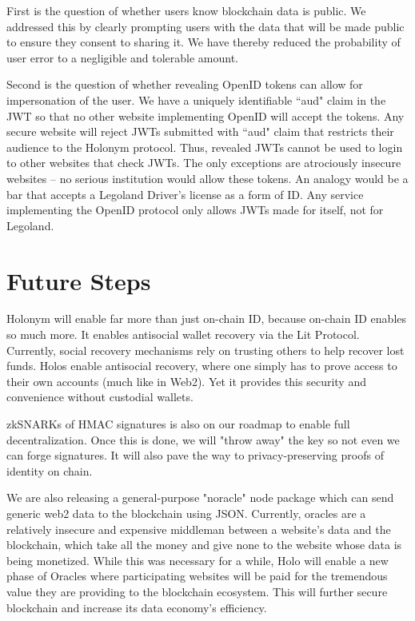 \documentclass[11pt,oneside,a4paper]{article}
\begin{document}
		First is the question of whether users know blockchain data is public. We addressed this by clearly prompting users with the data that will be made public to ensure they consent to sharing it. We have thereby reduced the probability of user error to a negligible and tolerable amount.
		
		Second is the question of whether revealing OpenID tokens can allow for impersonation of the user. We have a uniquely identifiable ``aud" claim in the JWT so that no other website implementing OpenID will accept the tokens. Any secure website will reject JWTs submitted with ``aud" claim that restricts their audience to the Holonym protocol. Thus, revealed JWTs cannot be used to login to other websites that check JWTs. The only exceptions are atrociously insecure websites -- no serious institution would allow these tokens. An analogy would be a bar that accepts a Legoland Driver's license as a form of ID. Any service implementing the OpenID protocol only allows JWTs made for itself, not for Legoland. 		
	\section*{Future Steps}
	
	Holonym will enable far more than just on-chain ID, because on-chain ID enables so much more. It enables antisocial wallet recovery via the Lit Protocol. Currently, social recovery mechanisms rely on trusting others to help recover lost funds. Holos enable antisocial recovery, where one simply has to prove access to their own accounts (much like in Web2). Yet it provides this security and convenience without custodial wallets. 
	

    zkSNARKs of HMAC signatures is also on our roadmap to enable full decentralization. Once this is done, we will "throw away" the key so not even we can forge signatures. It will also pave the way to privacy-preserving proofs of identity on chain.
    
    We are also releasing a general-purpose "noracle" node package which can send generic web2 data to the blockchain using JSON. Currently, oracles are a relatively insecure and expensive middleman between a  website's data and the blockchain, which take all the money and give none to the website whose data is being monetized. While this was necessary for a while, Holo will enable a new phase of Oracles where participating websites will be paid for the tremendous value they are providing to the blockchain ecosystem. This will further secure blockchain and increase its data economy's efficiency.
\end{document}
